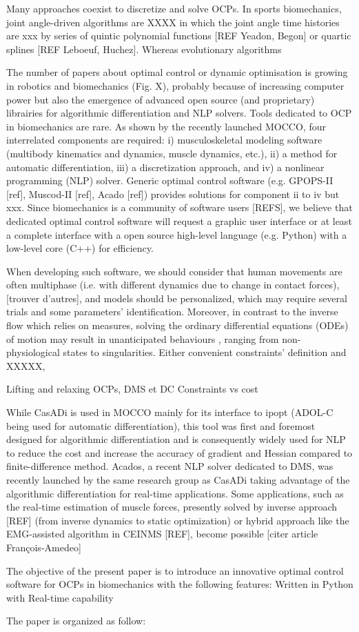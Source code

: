 
Many approaches coexist to discretize and solve OCPs. In sports biomechanics, joint angle-driven algorithms are XXXX in which the joint angle time histories are xxx by series of quintic polynomial functions [REF Yeadon, Begon] or quartic splines [REF Leboeuf, Huchez]. 
Whereas evolutionary algorithms 


The number of papers about optimal control or dynamic optimisation is growing in robotics and biomechanics (Fig. X), probably because of increasing computer power but also the emergence of advanced open source (and proprietary) librairies for algorithmic differentiation and NLP solvers. 
Tools dedicated to OCP in biomechanics are rare. As shown by the recently launched MOCCO, four interrelated components are required: i) musculoskeletal modeling software (multibody kinematics and dynamics, muscle dynamics, etc.), ii) a method for automatic differentiation, iii) a discretization approach, and iv) a nonlinear programming (NLP) solver. Generic optimal control software (e.g. GPOPS-II [ref], Muscod-II [ref], Acado [ref]) provides solutions for component ii to iv but xxx. Since biomechanics is a community of software users [REFS], we believe that dedicated optimal control software will request a graphic user interface or at least a complete interface with a open source high-level language (e.g. Python) with a low-level core (C++) for efficiency. 

When developing such software, we should consider that human movements are often multiphase (i.e. with different dynamics due to change in contact forces), [trouver d’autres], and models should be personalized, which may require several trials and some parameters’ identification. 
Moreover, in contrast to the inverse flow which relies on measures, solving the ordinary differential equations (ODEs) of motion may result in unanticipated behaviours , ranging from non-physiological states to singularities. Either convenient constraints’ definition  and XXXXX, 

Lifting and relaxing OCPs,  
DMS et DC
Constraints vs cost


While CasADi is used in MOCCO mainly for its interface to ipopt (ADOL-C being used for automatic differentiation),  this tool was first and foremost designed for algorithmic differentiation and is consequently widely used for NLP to reduce the cost and increase the accuracy of gradient and Hessian compared to finite-difference method. Acados, a recent NLP solver dedicated to DMS, was recently launched by the same research group as CasADi taking advantage of the algorithmic differentiation for real-time applications. Some applications, such as the real-time estimation of muscle forces, presently solved by inverse approach [REF] (from inverse dynamics to static optimization) or hybrid approach like the EMG-assisted algorithm in CEINMS [REF], become possible [citer article François-Amedeo]


The objective of the present paper is to introduce an innovative optimal control software for OCPs in biomechanics with the following features: 
Written in Python with 
Real-time capability 



The paper is organized as follow: 
